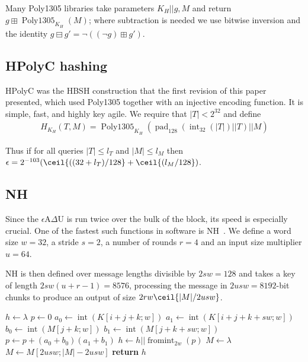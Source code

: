 \documentclass[journal=tosc,preprint,floatrow,submission]{iacrtrans}
\DeclareMathOperator{\Polydjb}{Poly1305}
\DeclareMathOperator{\intify}{int}
\DeclareMathOperator{\fromint}{fromint}
\DeclareMathOperator{\pad}{pad}
\begin{document}
Many Poly1305 libraries
take parameters $K_H || g, M$ and return $g \boxplus \Polydjb_{K_H}(M)$; where subtraction
is needed we use bitwise inversion and the identity
$g \boxminus g' = \neg ((\neg g) \boxplus g')$.

\subsection{HPolyC hashing}
HPolyC was the HBSH construction that the first revision of this paper presented, which used
Poly1305 together with an injective encoding function.
It is simple, fast, and highly key agile. We require that $|T| < 2^{32}$ and define
\begin{align*}
H_{K_H}(T, M) = \Polydjb_{K_H}(\pad_{128}(\intify_{32}(|T|) || T) || M)
\end{align*}

Thus if for all queries $|T| \leq l_T$ and $|M| \leq l_M$ then
$\epsilon = 2^{-103}(\ceil{((32 + l_T)/128} + \ceil{(l_M/128})$.

\subsection{NH}

Since the $\epsilon$A$\Delta$U is run twice over the bulk of the block, its speed is especially
crucial. One of the fastest such functions in software is NH~\cite{nh}.
We define a word size $w = 32$, a stride $s = 2$,
a number of rounds $r = 4$ and an input size multiplier $u = 64$.

NH is then defined over message
lengths divisible by $2sw = 128$
and takes a key of length $2sw(u + r -1) = 8576$, processing the message
in $2usw = 8192$-bit chunks to produce
an output of size $2rw\ceil{|M|/2usw}$.

\begin{algorithmic}[0]
    \State $h \gets \lambda$
            \State $p \gets 0$
                    \State $a_0 \gets \intify(K[i+j+k;w])$
                    \State $a_1 \gets \intify(K[i+j+k+sw;w])$
                    \State $b_0 \gets \intify(M[j+k;w])$
                    \State $b_1 \gets \intify(M[j+k+sw;w])$
                    \State $p \gets p + (a_0 + b_0)(a_1 + b_1)$
                \EndFor
            \EndFor
            \State $h \gets h || \fromint_{2w}(p)$
        \EndFor
            \State $M \gets \lambda$
        \Else
            \State $M \gets M[2usw;|M| - 2usw]$
        \EndIf
    \EndWhile
    \State \textbf{return} $h$
    \EndProcedure
\end{algorithmic}
\end{document}
